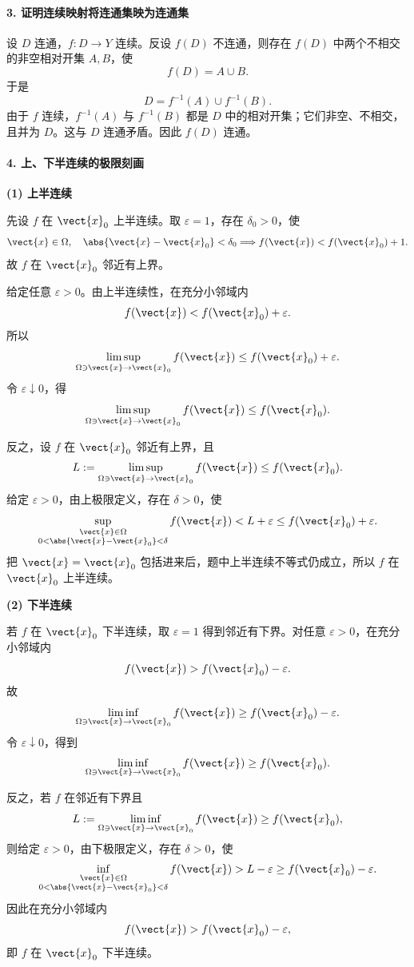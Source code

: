 \paragraph{3. 证明连续映射将连通集映为连通集}
\begin{xsolution}
设 $D$ 连通，$f\colon D\to Y$ 连续。反设 $f(D)$ 不连通，则存在 $f(D)$ 中两个不相交的非空相对开集 $A,B$，使
\[
  f(D)=A\cup B.
\]
于是
\[
  D=f^{-1}(A)\cup f^{-1}(B).
\]
由于 $f$ 连续，$f^{-1}(A)$ 与 $f^{-1}(B)$ 都是 $D$ 中的相对开集；它们非空、不相交，且并为 $D$。这与 $D$ 连通矛盾。因此 $f(D)$ 连通。
\end{xsolution}

\paragraph{4. 上、下半连续的极限刻画}

\textbf{(1) 上半连续}
\begin{xsolution}
先设 $f$ 在 $\vect{x}_0$ 上半连续。取 $\varepsilon=1$，存在 $\delta_0>0$，使
\[
  \vect{x}\in\Omega,
  \quad
  \abs{\vect{x}-\vect{x}_0}<\delta_0
  \Longrightarrow
  f(\vect{x})<f(\vect{x}_0)+1.
\]
故 $f$ 在 $\vect{x}_0$ 邻近有上界。

给定任意 $\varepsilon>0$。由上半连续性，在充分小邻域内
\[
  f(\vect{x})<f(\vect{x}_0)+\varepsilon.
\]
所以
\[
  \limsup_{\Omega\ni\vect{x}\to\vect{x}_0}f(\vect{x})
  \le f(\vect{x}_0)+\varepsilon.
\]
令 $\varepsilon\downarrow0$，得
\[
  \limsup_{\Omega\ni\vect{x}\to\vect{x}_0}f(\vect{x})
  \le f(\vect{x}_0).
\]

反之，设 $f$ 在 $\vect{x}_0$ 邻近有上界，且
\[
  L:=\limsup_{\Omega\ni\vect{x}\to\vect{x}_0}f(\vect{x})
  \le f(\vect{x}_0).
\]
给定 $\varepsilon>0$，由上极限定义，存在 $\delta>0$，使
\[
  \sup_{\substack{\vect{x}\in\Omega\\
  0<\abs{\vect{x}-\vect{x}_0}<\delta}}
  f(\vect{x})
  <L+\varepsilon
  \le f(\vect{x}_0)+\varepsilon.
\]
把 $\vect{x}=\vect{x}_0$ 包括进来后，题中上半连续不等式仍成立，所以 $f$ 在 $\vect{x}_0$ 上半连续。
\end{xsolution}

\textbf{(2) 下半连续}
\begin{xsolution}
若 $f$ 在 $\vect{x}_0$ 下半连续，取 $\varepsilon=1$ 得到邻近有下界。对任意 $\varepsilon>0$，在充分小邻域内
\[
  f(\vect{x})>f(\vect{x}_0)-\varepsilon.
\]
故
\[
  \liminf_{\Omega\ni\vect{x}\to\vect{x}_0}f(\vect{x})
  \ge f(\vect{x}_0)-\varepsilon.
\]
令 $\varepsilon\downarrow0$，得到
\[
  \liminf_{\Omega\ni\vect{x}\to\vect{x}_0}f(\vect{x})
  \ge f(\vect{x}_0).
\]

反之，若 $f$ 在邻近有下界且
\[
  L:=\liminf_{\Omega\ni\vect{x}\to\vect{x}_0}f(\vect{x})
  \ge f(\vect{x}_0),
\]
则给定 $\varepsilon>0$，由下极限定义，存在 $\delta>0$，使
\[
  \inf_{\substack{\vect{x}\in\Omega\\
  0<\abs{\vect{x}-\vect{x}_0}<\delta}}
  f(\vect{x})
  >L-\varepsilon
  \ge f(\vect{x}_0)-\varepsilon.
\]
因此在充分小邻域内
\[
  f(\vect{x})>f(\vect{x}_0)-\varepsilon,
\]
即 $f$ 在 $\vect{x}_0$ 下半连续。
\end{xsolution}

